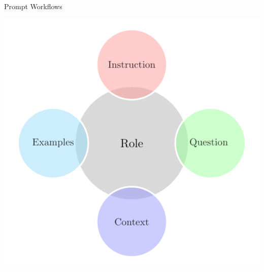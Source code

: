 \documentclass{beamer}
\begin{document}
\begin{frame}{Prompt Workflows}
\begin{minipage}[c][\textheight][c]{0.18\linewidth}
  \end{minipage}
  \hfill
  \begin{minipage}[c][\textheight][c]{0.32\linewidth}
    \vspace{-3\topskip}
    \includegraphics[width=\linewidth,keepaspectratio]{./tikz-prompt-workflow-common.pdf}
  \end{minipage}
\end{frame}
\end{document}
